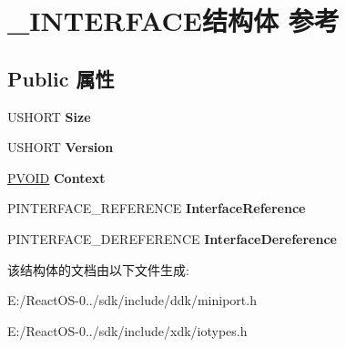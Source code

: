 \hypertarget{struct___i_n_t_e_r_f_a_c_e}{}\section{\+\_\+\+I\+N\+T\+E\+R\+F\+A\+C\+E结构体 参考}
\label{struct___i_n_t_e_r_f_a_c_e}
\subsection*{Public 属性}
\begin{DoxyCompactItemize}
\item 
\mbox{\label{struct___i_n_t_e_r_f_a_c_e_abcdaf4968ba45d92e3c74a5aa6046b86}} 
U\+S\+H\+O\+RT {\bfseries Size}
\item 
\mbox{\label{struct___i_n_t_e_r_f_a_c_e_ab4bc701d6eabcc3b92554cb023f6e1ae}} 
U\+S\+H\+O\+RT {\bfseries Version}
\item 
\mbox{\label{struct___i_n_t_e_r_f_a_c_e_a5b9847c7aae3c2ede862c93824914e8b}} 
\hyperlink{interfacevoid}{P\+V\+O\+ID} {\bfseries Context}
\item 
\mbox{\label{struct___i_n_t_e_r_f_a_c_e_abfc9648e2281b60ebf5a132223887eaa}} 
P\+I\+N\+T\+E\+R\+F\+A\+C\+E\+\_\+\+R\+E\+F\+E\+R\+E\+N\+CE {\bfseries Interface\+Reference}
\item 
\mbox{\label{struct___i_n_t_e_r_f_a_c_e_ac3cf985e1e5af62b88956ca5be367fbf}} 
P\+I\+N\+T\+E\+R\+F\+A\+C\+E\+\_\+\+D\+E\+R\+E\+F\+E\+R\+E\+N\+CE {\bfseries Interface\+Dereference}
\end{DoxyCompactItemize}


该结构体的文档由以下文件生成\+:\begin{DoxyCompactItemize}
\item 
E\+:/\+React\+O\+S-\/0../sdk/include/ddk/miniport.\+h\item 
E\+:/\+React\+O\+S-\/0../sdk/include/xdk/iotypes.\+h\end{DoxyCompactItemize}
